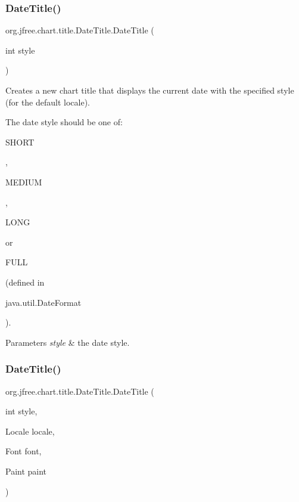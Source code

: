 \subsubsection{\texorpdfstring{Date\+Title()}{DateTitle()}\hspace{0.1cm}{\footnotesize\ttfamily [2/4]}}
{\footnotesize\ttfamily org.\+jfree.\+chart.\+title.\+Date\+Title.\+Date\+Title (\begin{DoxyParamCaption}\item[{int}]{style }\end{DoxyParamCaption})}

Creates a new chart title that displays the current date with the specified style (for the default locale). 

The date style should be one of\+:
\begin{DoxyCode}
SHORT 
\end{DoxyCode}
 , 
\begin{DoxyCode}
MEDIUM 
\end{DoxyCode}
 ,
\begin{DoxyCode}
LONG 
\end{DoxyCode}
 or
\begin{DoxyCode}
FULL 
\end{DoxyCode}
 (defined in
\begin{DoxyCode}
java.util.DateFormat 
\end{DoxyCode}
 ).


\begin{DoxyParams}{Parameters}
{\em style} & the date style. \\
\hline
\end{DoxyParams}
\mbox{\label{classorg_1_1jfree_1_1chart_1_1title_1_1_date_title_a6c19017125745efe8c80e7a91b307676}} 
\subsubsection{\texorpdfstring{Date\+Title()}{DateTitle()}\hspace{0.1cm}{\footnotesize\ttfamily [3/4]}}
{\footnotesize\ttfamily org.\+jfree.\+chart.\+title.\+Date\+Title.\+Date\+Title (\begin{DoxyParamCaption}\item[{int}]{style,  }\item[{Locale}]{locale,  }\item[{Font}]{font,  }\item[{Paint}]{paint }\end{DoxyParamCaption})}

